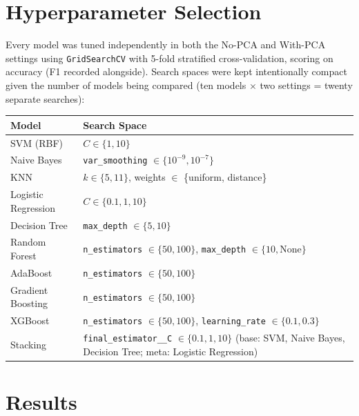 \documentclass[12pt,a4paper]{article}
\begin{document}
\section{Hyperparameter Selection}
Every model was tuned independently in both the No-PCA and With-PCA settings using
\texttt{GridSearchCV} with 5-fold stratified cross-validation, scoring on accuracy (F1
recorded alongside). Search spaces were kept intentionally compact given the number of
models being compared (ten models $\times$ two settings = twenty separate searches):

\begin{longtable}{ll}
\toprule
Model & Search Space \\
\midrule
SVM (RBF) & $C \in \{1, 10\}$ \\
Naive Bayes & \texttt{var\_smoothing} $\in \{10^{-9}, 10^{-7}\}$ \\
KNN & $k \in \{5, 11\}$, weights $\in$ \{uniform, distance\} \\
Logistic Regression & $C \in \{0.1, 1, 10\}$ \\
Decision Tree & \texttt{max\_depth} $\in \{5, 10\}$ \\
Random Forest & \texttt{n\_estimators} $\in \{50, 100\}$, \texttt{max\_depth} $\in \{10,
\text{None}\}$ \\
AdaBoost & \texttt{n\_estimators} $\in \{50, 100\}$ \\
Gradient Boosting & \texttt{n\_estimators} $\in \{50, 100\}$ \\
XGBoost & \texttt{n\_estimators} $\in \{50, 100\}$, \texttt{learning\_rate} $\in \{0.1,
0.3\}$ \\
Stacking & \texttt{final\_estimator\_\_C} $\in \{0.1, 1, 10\}$ (base: SVM, Naive Bayes,
Decision Tree; meta: Logistic Regression) \\
\bottomrule
\end{longtable}

\section{Results}
\end{document}
